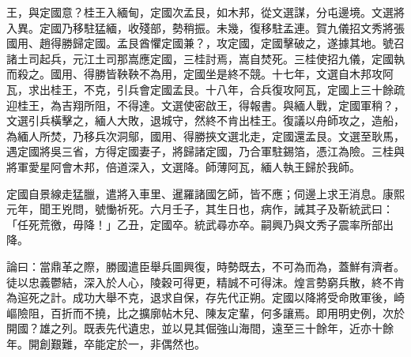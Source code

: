 \begin{pinyinscope}
王，與定國意？桂王入緬甸，定國次孟艮，如木邦，從文選謀，分屯邊境。文選將入異。定國乃移駐猛緬，收殘部，勢稍振。未幾，復移駐孟連。賀九儀招文秀將張國用、趙得勝歸定國。孟艮酋懼定國兼？，攻定國，定國擊破之，遂據其地。號召諸土司起兵，元江土司那嵩應定國，三桂討焉，嵩自焚死。三桂使招九儀，定國執而殺之。國用、得勝皆鞅鞅不為用，定國坐是終不競。十七年，文選自木邦攻阿瓦，求出桂王，不克，引兵會定國孟艮。十八年，合兵復攻阿瓦，定國上三十餘疏迎桂王，為吉翔所阻，不得達。文選使密啟王，得報書。與緬人戰，定國軍稍？，文選引兵橫擊之，緬人大敗，退城守，然終不肯出桂王。復議以舟師攻之，造船，為緬人所焚，乃移兵次洞鄔，國用、得勝挾文選北走，定國還孟艮。文選至耿馬，遇定國將吳三省，方得定國妻子，將歸諸定國，乃合軍駐錫箔，憑江為險。三桂與將軍愛星阿會木邦，倍道深入，文選降。師薄阿瓦，緬人執王歸於我師。

定國自景線走猛臘，遣將入車里、暹羅諸國乞師，皆不應；伺邊上求王消息。康熙元年，聞王兇問，號慟祈死。六月壬子，其生日也，病作，誡其子及靳統武曰：「任死荒徼，毋降！」乙丑，定國卒。統武尋亦卒。嗣興乃與文秀子震率所部出降。

論曰：當鼎革之際，勝國遣臣舉兵圖興復，時勢既去，不可為而為，蓋鮮有濟者。徒以忠義鬱結，深入於人心，陵穀可得更，精誠不可得沫。煌言勢窮兵散，終不肯為逭死之計。成功大舉不克，退求自保，存先代正朔。定國以降將受命敗軍後，崎嶇險阻，百折而不撓，比之擴廓帖木兒、陳友定輩，何多讓焉。即用明史例，次於開國？雄之列。既表先代遺忠，並以見其倔強山海間，遠至三十餘年，近亦十餘年。開創艱難，卒能定於一，非偶然也。


\end{pinyinscope}